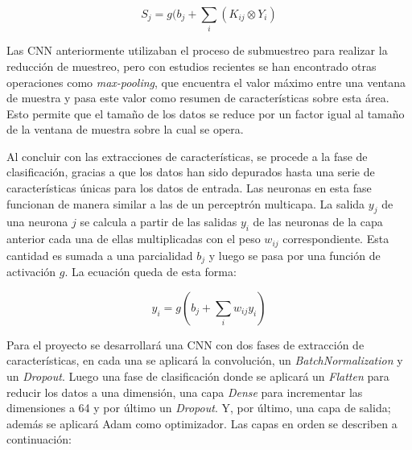 \begin{equation}
	S_{j}=g(b_{j}+\sum_{i}(K_{ij}\otimes Y_{i})
\end{equation}

  Las CNN anteriormente utilizaban el proceso de submuestreo para realizar la reducci\'{o}n de muestreo, pero con estudios recientes se han encontrado otras operaciones como \textit{max-pooling}, que encuentra el valor m\'{a}ximo entre una ventana de muestra y pasa este valor como resumen de caracter\'{i}sticas sobre esta \'{a}rea. Esto permite que el tama\~{n}o de los datos se reduce por un factor igual al tama\~{n}o de la ventana de muestra sobre la cual se opera.
  
  Al concluir con las extracciones de caracter\'{i}sticas, se procede a la fase de clasificaci\'{o}n, gracias a que los datos han sido depurados hasta una serie de caracter\'{i}sticas \'{u}nicas para los datos de entrada. Las neuronas en esta fase funcionan de manera similar a las de un perceptr\'{o}n multicapa. La salida $y_{j}$ de una neurona $j$ se calcula a partir de las salidas $y_{i}$ de las neuronas de la capa anterior cada una de ellas multiplicadas con el peso $w_{ij}$ correspondiente. Esta cantidad es sumada a una parcialidad $b_{j}$ y luego se pasa por una funci\'{o}n de activaci\'{o}n $g$. La ecuaci\'{o}n queda de esta forma:

\begin{equation}
	y_{i}=g(b_{j}+\sum_{i}w_{ij}y_{i})
\end{equation}

  Para el proyecto se desarrollar\'{a} una CNN con dos fases de extracci\'{o}n de caracter\'{i}sticas, en cada una se aplicar\'{a} la convoluci\'{o}n, un \textit{BatchNormalization} y un \textit{Dropout}. Luego una fase de clasificaci\'{o}n donde se aplicar\'{a} un \textit{Flatten} para reducir los datos a una dimensi\'{o}n, una capa \textit{Dense} para incrementar las dimensiones a 64 y por \'{u}ltimo un \textit{Dropout}. Y, por \'{u}ltimo, una capa de salida; adem\'{a}s se aplicar\'{a} Adam como optimizador. Las capas en orden se describen a continuaci\'{o}n:
  
